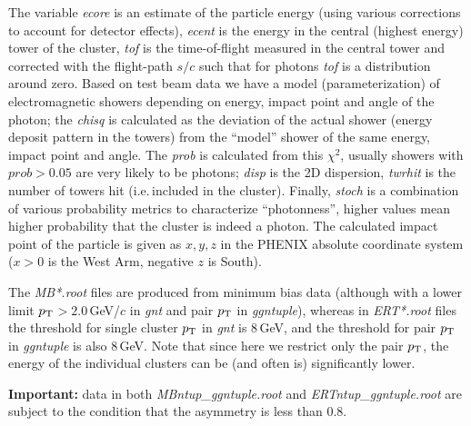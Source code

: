 \documentclass[pdftex,12pt,letter]{article}
\newcommand{\pt}{\mbox{$p_{\rm T}$}\xspace}
\newcommand{\gev}{\mbox{GeV}\xspace}
\newcommand{\gevc}{\mbox{GeV/$c$}\xspace}
\begin{document}
The variable {\it ecore} is an estimate of the particle energy (using various
corrections to account for detector effects), {\it ecent} is the
energy in the central (highest energy) tower of the cluster, 
{\it tof} is the time-of-flight measured in the central tower and
corrected with the flight-path $s/c$ such that for photons {\it tof}
is a distribution around zero.  Based on test beam data we have a model
(parameterization) of electromagnetic showers depending on energy, impact
point and angle of the photon; the {\it chisq} is calculated as the
deviation of the actual shower (energy deposit pattern in the towers)
from the ``model'' shower of the same energy, impact point and angle.
The {\it prob} is calculated from this $\chi^2$, usually showers with
$prob>0.05$ are very likely to be photons;  {\it disp} is the 2D
dispersion, {\it twrhit} is the number of towers hit (i.e.\,included in
the cluster). Finally, {\it stoch} is a combination of various
probability metrics to characterize ``photonness'', higher values
mean higher probability that the cluster is indeed a photon.  The
calculated impact point of the particle is given as $x,y,z$ in the
PHENIX absolute coordinate system ($x>0$ is the West Arm, negative $z$
is South).

The {\it MB*.root} files are produced from minimum bias data (although
with a lower limit  \mbox{\pt$>2.0$\,\gevc} in {\it gnt} and pair \pt in
{\it ggntuple}), whereas in {\it ERT*.root} files the threshold for 
single cluster \pt in {\it gnt} is 8\,\gev, and the threshold for pair
\pt in {\it ggntuple} is also 8\,\gev.  Note that since here we
restrict only the pair \pt, the energy of the individual clusters can
be (and often is) significantly lower. 

\textbf{Important:} data in both {\it MBntup\_ggntuple.root} and {\it ERTntup\_ggntuple.root}
are subject to the condition that the asymmetry is less than 0.8.
\end{document}

